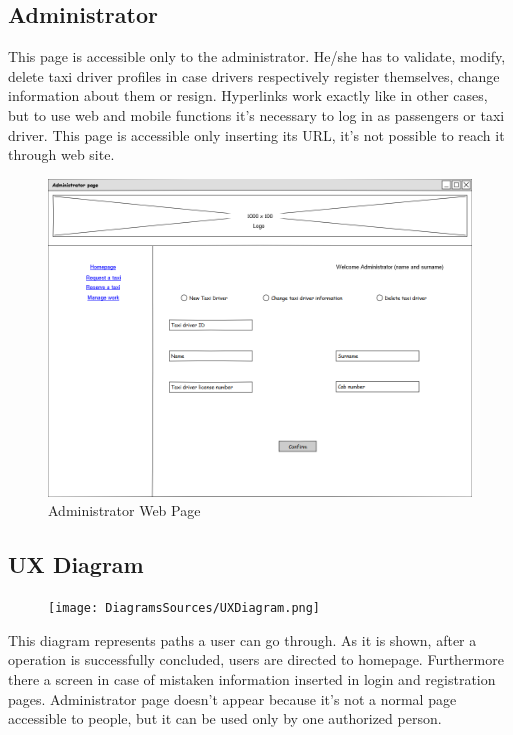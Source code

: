 \subsection{Administrator}
This page is accessible only to the administrator. He/she has to validate, modify, delete taxi driver profiles in case drivers respectively register themselves, change information about them or resign. \newline Hyperlinks work exactly like in other cases, but to use web and mobile functions it's necessary to log in as passengers or taxi driver. This page is accessible only inserting its URL, it's not possible to reach it through web site.
\begin{figure}[H]
\centering
\includegraphics[scale=0.35]{mockups/administrator.png}
\caption{Administrator Web Page}
\end{figure}
\subsection{UX Diagram}
\begin{figure} [H]
\centering
\texttt{[image: DiagramsSources/UXDiagram.png]}
\end{figure}
This diagram represents paths a user can go through. As it is shown, after a operation is successfully concluded, users are directed to homepage. Furthermore there a screen in case of mistaken information inserted in login and registration pages. \newline Administrator page doesn't appear because it's not a normal page accessible to people, but it can be used only by one authorized person.